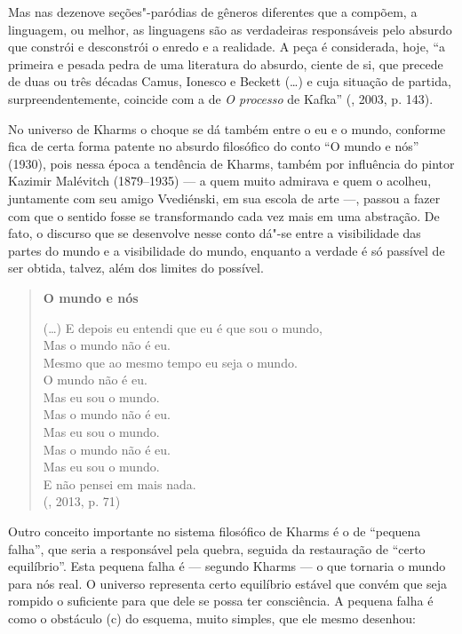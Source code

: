 Mas nas dezenove seções"-paródias de gêneros diferentes que a compõem, a
linguagem, ou melhor, as linguagens são as verdadeiras responsáveis pelo
absurdo que constrói e desconstrói o enredo e a realidade. A peça é
considerada, hoje, ``a primeira e pesada pedra de uma literatura do
absurdo, ciente de si, que precede de duas ou
três décadas Camus, Ionesco e Beckett (\ldots{}) e cuja situação de
partida, surpreendentemente, coincide com a de \emph{O processo}
de Kafka'' (, 2003, p. 143).

No universo de Kharms o choque se dá também entre o eu e o mundo,
conforme fica de certa forma patente no absurdo filosófico do conto ``O
mundo e nós'' (1930), pois nessa época a tendência de Kharms, também por
influência do pintor Kazimir Malévitch (1879--1935) --- a quem muito admirava e quem o
acolheu, juntamente com seu amigo Vvediénski, em sua escola de arte ---,
passou a fazer com que o sentido fosse se transformando cada vez mais
em uma abstração. De fato, o discurso que se desenvolve nesse conto
dá"-se entre a visibilidade das partes do mundo e a visibilidade do
mundo, enquanto a verdade é só passível de ser obtida, talvez, além dos
limites do possível.

\begin{verse}
\textbf{O mundo e nós}

(\ldots{})
E depois eu entendi que eu é que sou o mundo,\\
Mas o mundo não é eu.\\ 
Mesmo que ao mesmo tempo eu seja o mundo.\\
O mundo não é eu.\\
Mas eu sou o mundo.\\
Mas o mundo não é eu.\\
Mas eu sou o mundo.\\
Mas o mundo não é eu.\\
Mas eu sou o mundo.\\
E não pensei em mais nada.\\

(, 2013, p. 71)


\end{verse}

Outro conceito importante no sistema filosófico de Kharms é o de
``pequena falha'', que seria a responsável pela quebra, seguida da
restauração de ``certo equilíbrio''. Esta pequena falha é --- segundo
Kharms --- o que tornaria o mundo para nós real. O universo representa
certo equilíbrio estável que convém que seja rompido o suficiente para
que dele se possa ter consciência. A pequena falha é como o obstáculo
(c) do esquema, muito simples, que ele mesmo desenhou:


